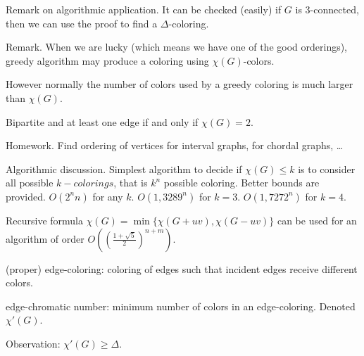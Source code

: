 \documentclass[12pt,a4paper]{article}
\begin{document}
Remark on algorithmic application. It can be checked (easily) if \(G\) is
3-connected, then we can use the proof to find a \(\Delta\)-coloring.

Remark. When we are lucky (which means we have one of the good orderings),
greedy algorithm may produce a coloring using \(\chi(G)\)-colors.

However normally the number of colors used by a greedy coloring is much larger
than \(\chi(G)\).

Bipartite and at least one edge if and only if \(\chi(G)=2\).

\begin{center}
\end{center}

Homework. Find ordering of vertices for interval graphs, for chordal graphs, …

Algorithmic discussion.  Simplest algorithm to decide if \(\chi(G) \leq k\) is
to consider all possible \(k-colorings\), that is \(k^n\) possible
coloring. Better bounds are provided. \(O(2^n n)\) for any
\(k\). \(O(1,3289^n)\) for \(k=3\). \(O(1,7272^n)\) for \(k=4\).

Recursive formula \(\chi(G)=\min\{\chi(G+uv), \chi(G-uv)\}\) can be used for an
algorithm of order \(O\left({\left(\frac{1+\sqrt{5}}{2}\right)}^{n+m}\right)\).

(proper) edge-coloring: coloring of edges such that incident edges receive
different colors.

edge-chromatic number: minimum number of colors in an edge-coloring. Denoted
\(\chi'(G)\).

Observation: \(\chi'(G) \geq \Delta\).
\end{document}
